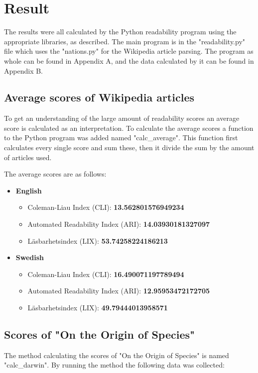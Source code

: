 \documentclass[a4paper]{article}
\begin{document}
\section{Result}
The results were all calculated by the Python readability program using the appropriate libraries, as described. The main program is in the "readability.py" file which uses the "nations.py" for the Wikipedia article parsing. The program as whole can be found in Appendix A, and the data calculated by it can be found in Appendix B. 

\subsection{Average scores of Wikipedia articles}
To get an understanding of the large amount of readability scores an average score is calculated as an interpretation. To calculate the average scores a function to the Python program was added named "calc\_average". This function first calculates every single score and sum these, then it divide the sum by the amount of articles used.

The average scores are as follows:

\begin{itemize}
    \item \textbf{English}
    \begin{itemize}
        \item Coleman-Liau Index (CLI): \textbf{13.562801576949234}
        \item Automated Readability Index (ARI): \textbf{14.03930181327097}
        \item Läsbarhetsindex (LIX): \textbf{53.74258224186213}
    \end{itemize}
    \item \textbf{Swedish}
    \begin{itemize}
        \item Coleman-Liau Index (CLI): \textbf{16.490071197789494}
        \item Automated Readability Index (ARI): \textbf{12.95953472172705}
        \item Läsbarhetsindex (LIX): \textbf{49.79444013958571}
    \end{itemize}
\end{itemize}

\subsection{Scores of "On the Origin of Species"}
The method calculating the scores of "On the Origin of Species" is named "calc\_darwin". By running the method the following data was collected:
\end{document}
